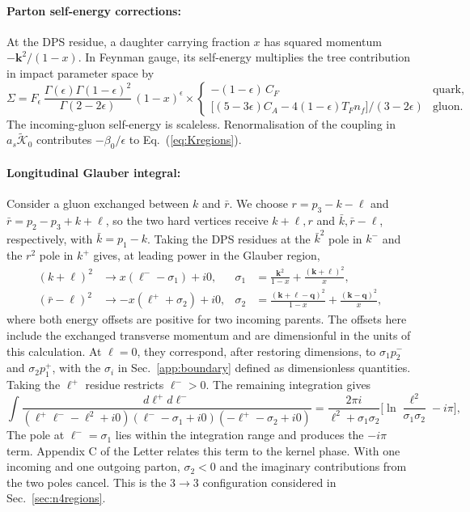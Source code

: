 \documentclass[%
 onecolumn,
 superscriptaddress,
 preprintnumbers,
 nofootinbib,
 amsmath,amssymb,
 aps,
 prl,
]{revtex4-2}
\newcommand{\kk}{\boldsymbol k}
\newcommand{\qq}{\boldsymbol q}
\begin{document}
\paragraph{Parton self-energy corrections: }
At the DPS residue, a daughter carrying fraction $x$ has
squared momentum $-\kk^2/(1-x)$. In Feynman gauge, its
self-energy multiplies the tree contribution in impact parameter
space by
\begin{equation}
\Sigma=F_\epsilon\,\frac{\Gamma(\epsilon)\Gamma(1-\epsilon)^2}{\Gamma(2-2\epsilon)}\,(1-x)^\epsilon\times
\begin{cases}-(1-\epsilon)\,C_F&\text{quark},\\[2pt]
\big[(5-3\epsilon)C_A-4(1-\epsilon)T_Fn_f\big]/(3-2\epsilon)&\text{gluon}.
\end{cases}
\label{eq:sigma}
\end{equation}
The incoming-gluon self-energy is scaleless. Renormalisation of
the coupling in $a_s\widetilde{\mathcal K}_0$ contributes
$-\beta_0/\epsilon$ to Eq.~(\ref{eq:Kregions}).

\paragraph{Longitudinal Glauber integral: }
Consider a gluon exchanged between $k$ and $\bar r$. We choose
$r=p_3-k-\ell$ and $\bar r=p_2-p_3+k+\ell$, so the two hard
vertices receive $k+\ell,r$ and $\bar k,\bar r-\ell$,
respectively, with $\bar k=p_1-k$. Taking the DPS residues at
the $\bar k^2$ pole in $k^-$ and the $r^2$ pole in $k^+$ gives,
at leading power in the Glauber region,
\begin{equation}
\begin{aligned}
(k+\ell)^2&\to x(\ell^--\sigma_1)+i0,&\sigma_1&=\frac{\kk^2}{1-x}+\frac{(\kk+\boldsymbol\ell)^2}x,\\
(\bar r-\ell)^2&\to-x(\ell^++\sigma_2)+i0,&\sigma_2&=\frac{(\kk+\boldsymbol\ell-\qq)^2}{1-x}+\frac{(\kk-\qq)^2}x,
\end{aligned}
\end{equation}
where both energy offsets are positive for two incoming parents.
The offsets here include the exchanged transverse momentum and are
dimensionful in the units of this calculation. At
$\boldsymbol\ell=0$, they correspond, after restoring dimensions,
to $\sigma_1p_2^-$ and $\sigma_2p_1^+$, with the $\sigma_i$ in
Sec.~\ref{app:boundary} defined as dimensionless quantities.
%
Taking the $\ell^+$ residue restricts $\ell^->0$.
The remaining integration gives
\begin{equation}
\int\frac{d\ell^+d\ell^-}{(\ell^+\ell^--\boldsymbol\ell^2+i0)(\ell^--\sigma_1+i0)(-\ell^+-\sigma_2+i0)}
=\frac{2\pi i}{\boldsymbol\ell^2+\sigma_1\sigma_2}\Big[\ln\frac{\boldsymbol\ell^2}{\sigma_1\sigma_2}-i\pi\Big],
\label{eq:glauberint}
\end{equation}
The pole at $\ell^-=\sigma_1$ lies within the integration
range and produces the $-i\pi$ term. Appendix C of the Letter
relates this term to the kernel phase. With one incoming and one
outgoing parton, $\sigma_2<0$ and the imaginary contributions from
the two poles cancel. This is the $3\to3$ configuration considered
in Sec.~\ref{sec:n4regions}.
\end{document}
